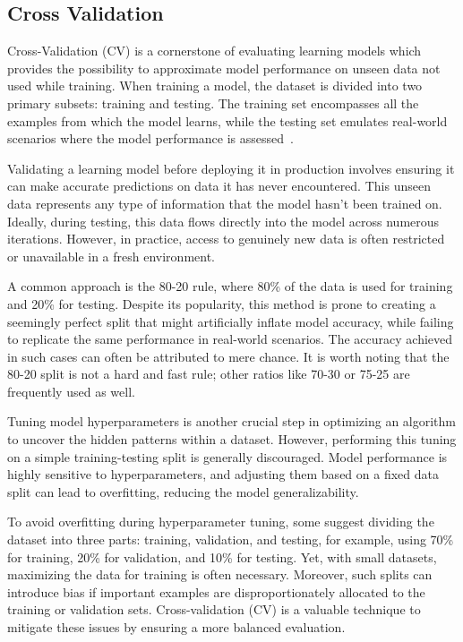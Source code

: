 \documentclass[12pt,a4paper]{report}
\begin{document}
\subsection{Cross Validation}
Cross-Validation (CV) is a cornerstone of evaluating learning models which provides the possibility to approximate model performance on unseen data not used while training. When training a model, the dataset is divided into two primary subsets: training and testing. The training set encompasses all the examples from which the model learns, while the testing set emulates real-world scenarios where the model performance is assessed~\cite{crossvalidation}.

Validating a learning model before deploying it in production involves ensuring it can make accurate predictions on data it has never encountered. This unseen data represents any type of information that the model hasn't been trained on. Ideally, during testing, this data flows directly into the model across numerous iterations. However, in practice, access to genuinely new data is often restricted or unavailable in a fresh environment.

A common approach is the 80-20 rule, where 80\% of the data is used for training and 20\% for testing. Despite its popularity, this method is prone to creating a seemingly perfect split that might artificially inflate model accuracy, while failing to replicate the same performance in real-world scenarios. The accuracy achieved in such cases can often be attributed to mere chance. It is worth noting that the 80-20 split is not a hard and fast rule; other ratios like 70-30 or 75-25 are frequently used as well.

Tuning model hyperparameters is another crucial step in optimizing an algorithm to uncover the hidden patterns within a dataset. However, performing this tuning on a simple training-testing split is generally discouraged. Model performance is highly sensitive to hyperparameters, and adjusting them based on a fixed data split can lead to overfitting, reducing the model generalizability.

To avoid overfitting during hyperparameter tuning, some suggest dividing the dataset into three parts: training, validation, and testing, for example, using 70\% for training, 20\% for validation, and 10\% for testing. Yet, with small datasets, maximizing the data for training is often necessary. Moreover, such splits can introduce bias if important examples are disproportionately allocated to the training or validation sets. Cross-validation (CV) is a valuable technique to mitigate these issues by ensuring a more balanced evaluation.
\end{document}
